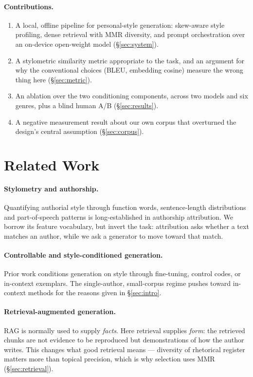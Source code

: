 \documentclass[11pt]{article}
\begin{document}
\paragraph{Contributions.}
\begin{enumerate}\itemsep0pt
  \item A local, offline pipeline for personal-style generation: skew-aware
        style profiling, dense retrieval with MMR diversity, and prompt
        orchestration over an on-device open-weight model
        (\S\ref{sec:system}).
  \item A stylometric similarity metric appropriate to the task, and an argument
        for why the conventional choices (BLEU, embedding cosine) measure the
        wrong thing here (\S\ref{sec:metric}).
  \item An ablation over the two conditioning components, across two models and
        six genres, plus a blind human A/B (\S\ref{sec:results}).
  \item A negative measurement result about our own corpus that overturned the
        design's central assumption (\S\ref{sec:corpus}).
\end{enumerate}

\section{Related Work}
\label{sec:related}

\paragraph{Stylometry and authorship.}
Quantifying authorial style through function words, sentence-length
distributions and part-of-speech patterns is long-established in authorship
attribution. We borrow its feature vocabulary, but invert the task: attribution
asks whether a text matches an author, while we ask a generator to move toward
that match.

\paragraph{Controllable and style-conditioned generation.}
Prior work conditions generation on style through fine-tuning, control codes, or
in-context exemplars. The single-author, small-corpus regime pushes toward
in-context methods for the reasons given in \S\ref{sec:intro}.

\paragraph{Retrieval-augmented generation.}
RAG is normally used to supply \emph{facts}. Here retrieval supplies \emph{form}:
the retrieved chunks are not evidence to be reproduced but demonstrations of how
the author writes. This changes what good retrieval means --- diversity of
rhetorical register matters more than topical precision, which is why selection
uses MMR (\S\ref{sec:retrieval}).
\end{document}
